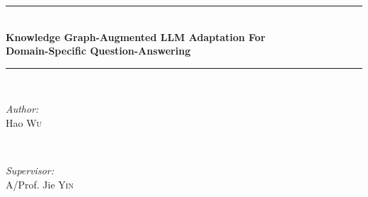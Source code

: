 \documentclass[a4paper,12pt]{article}
\theoremstyle{definition}
\begin{document}
    \begin{minipage}{\textwidth}

        \newcommand{\HRule}{\rule{\linewidth}{0.5mm}} %
        \center %
        \HRule \\[0.4cm]
        { \Large \bfseries Knowledge Graph-Augmented LLM Adaptation For\\\vspace{0.2cm} Domain-Specific Question-Answering}\\[0.4cm] %
        \HRule \\[1.5cm]
        \begin{minipage}{0.4\textwidth}
        \begin{flushleft} \large
        \emph{Author:}\\
        Hao \textsc{Wu}\\
        \end{flushleft}
        \end{minipage}
        ~
        \begin{minipage}{0.5\textwidth}
        \begin{flushright} \large
        \emph{Supervisor:} \\
        A/Prof. Jie \textsc{Yin}
        \end{flushright}
        \end{minipage}\\[3cm]
       
    \end{minipage}


    \setlength{\parindent}{0pt}
    \setlength{\parskip}{1em}
    \onehalfspacing
    \vspace{0.8cm}
    
    
    
    
    
    


    \newpage
    \printbibliography
\end{document}
